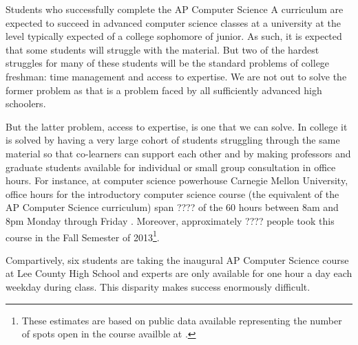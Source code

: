 Students who successfully complete the AP Computer Science A curriculum are
expected to succeed in advanced computer science classes at a university at
the level typically expected of a college sophomore of junior. As such, it is
expected that some students will struggle with the material. But two of the
hardest struggles for many of these students will be the standard problems
of college freshman: time management and access to expertise. We are not out
to solve the former problem as that is a problem faced by all sufficiently
advanced high schoolers.

But the latter problem, access to expertise, is one that we can solve. In
college it is solved by having a very large cohort of students struggling
through the same material so that co-learners can support each other and
by making professors and graduate students available for individual or small
group consultation in office hours. For instance, at computer science powerhouse
Carnegie Mellon University, office hours for the introductory computer science
course (the equivalent of the AP Computer Science curriculum) span ???? of the
60 hours between 8am and 8pm Monday through Friday \cite{SomeCMUWebsite}.
Moreover, approximately ???? people took this course in the Fall Semester of
2013\footnote{These estimates are based on public data available representing
the number of spots open in the course availble at \cite{CMUDirectory}.}.

Compartively, six students are taking the inaugural AP Computer Science course
at Lee County High School and experts are only available for one hour a day each
weekday during class. This disparity makes success enormously difficult.
